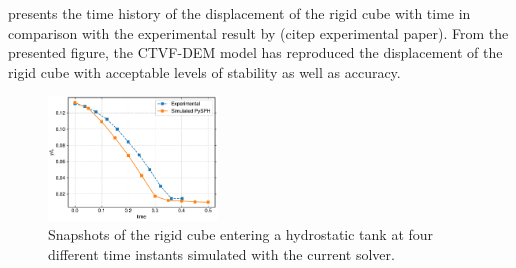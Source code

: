  presents the time history of the
displacement of the rigid cube with time in comparison with the experimental
result by (citep experimental paper). From the presented figure, the CTVF-DEM
model has reproduced the displacement of the rigid cube with acceptable levels
of stability as well as accuracy.
\begin{figure}[!htpb]
  \centering
  \includegraphics[width=0.4\textwidth]{figures/rfc/figures/qiu_2017_falling_solid_in_water_2d/y_cm_vs_time}
  \caption{Snapshots of the rigid cube entering a hydrostatic tank at four
    different time instants simulated with the current solver.}
\label{fig:disp-falling-solid-in-water}
\end{figure}












